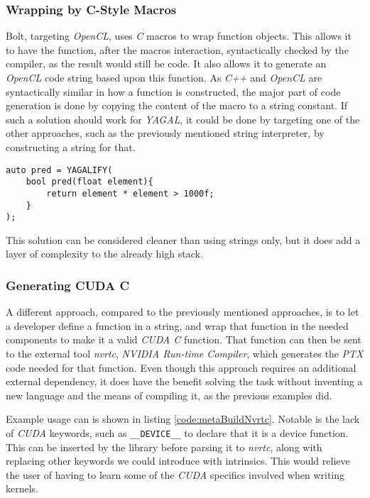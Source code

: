 \subsubsection{Wrapping by C-Style Macros}
Bolt, targeting \textit{OpenCL}, uses \textit{C} macros to wrap function objects. This allows it to have the function, after the macros interaction, syntactically checked by the compiler, as the result would still be code. It also allows it to generate an \textit{OpenCL} code string based upon this function. As \textit{C++} and \textit{OpenCL} are syntactically similar in how a function is constructed, the major part of code generation is done by copying the content of the macro to a string constant. If such a solution should work for \textit{YAGAL}, it could be done by targeting one of the other approaches, such as the previously mentioned string interpreter, by constructing a string for that.

\begin{lstlisting}[caption={Code showing possible construction of kernel with macro, named YAGALIFY, and \textit{C++} lambda.}, label={code:metaBuildMacro}]
auto pred = YAGALIFY(
    bool pred(float element){
        return element * element > 1000f;
    }
);
\end{lstlisting}

This solution can be considered cleaner than using strings only, but it does add a layer of complexity to the already high stack.

\subsubsection{Generating CUDA C}
A different approach, compared to the previously mentioned approaches, is to let a developer define a function in a string, and wrap that function in the needed components to make it a valid \textit{CUDA C} function. That function can then be sent to the external tool \textit{nvrtc}\cite{nvrtcDoc}, \textit{NVIDIA Run-time Compiler}, which generates the \textit{PTX} code needed for that function. Even though this approach requires an additional external dependency, it does have the benefit solving the task without inventing a new language and the means of compiling it, as the previous examples did.

Example usage can is shown in listing \ref{code:metaBuildNvrtc}. Notable is the lack of \textit{CUDA} keywords, such as \texttt{\_\_DEVICE\_\_} to declare that it is a device function. This can be inserted by the library before parsing it to \textit{nvrtc}, along with replacing other keywords we could introduce with intrinsics. This would relieve the user of having to learn some of the \textit{CUDA} specifics involved when writing kernels.


